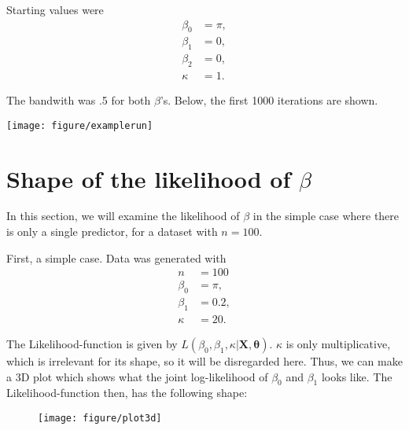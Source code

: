 \documentclass{article}\usepackage[]{graphicx}\usepackage[]{color}
\makeatletter
\def\maxwidth{ %
  \ifdim\Gin@nat@width>\linewidth
    \linewidth
  \else
    \Gin@nat@width
  \fi
}
\newenvironment{knitrout}{}{} %
\makeatother
\begin{document}
Starting values were
\begin{align*}
\beta_0 &= \pi, \\
\beta_1 &= 0, \\
\beta_2 &= 0, \\
\kappa &= 1.
\end{align*}

The bandwith was .5 for both $\beta$'s. Below, the first 1000 iterations are shown.

\begin{knitrout}
\color{fgcolor}

{\centering \texttt{[image: figure/examplerun]} 

}



\end{knitrout}





\newpage

\section{Shape of the likelihood of $\beta$} \label{betashape}

In this section, we will examine the likelihood of $\beta$ in the simple case where there is only a single predictor, for a dataset with $n=100$.

First, a simple case. Data was generated with
\begin{align*}
n &= 100 \\
\beta_0 &= \pi, \\
\beta_1 &= 0.2, \\
\kappa &= 20.
\end{align*}

The Likelihood-function is given by $L(\beta_0, \beta_1, \kappa \vert \boldsymbol{X}, \boldsymbol{\theta})$. $\kappa$ is only multiplicative, which is irrelevant for its shape, so it will be disregarded here. Thus, we can make a 3D plot which shows what the joint log-likelihood of $\beta_0$ and $\beta_1$ looks like. The Likelihood-function then, has the following shape:
\begin{figure}[h!]
\begin{knitrout}
\color{fgcolor}

{\centering \texttt{[image: figure/plot3d]} 

}



\end{knitrout}

\end{figure}
\end{document}
